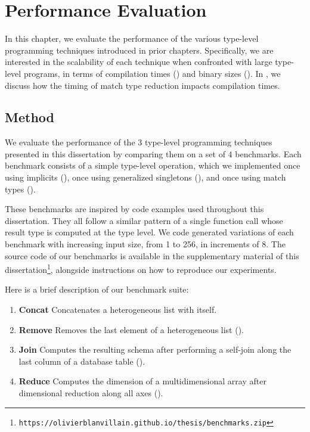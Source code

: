 

\chapter{Performance Evaluation}
\label{chap:performance-evaluation}

In this chapter, we evaluate the performance of the various type-level programming techniques introduced in prior chapters.
Specifically, we are interested in the scalability of each technique when confronted with large type-level programs, in terms of compilation times () and binary sizes ().
In , we discuss how the timing of match type reduction impacts compilation times.

\section{Method}

We evaluate the performance of the 3 type-level programming techniques presented in this dissertation by comparing them on a set of 4 benchmarks.
Each benchmark consists of a simple type-level operation, which we implemented once using implicits (), once using generalized singletons (), and once using match types ().

These benchmarks are inspired by code examples used throughout this dissertation. They all follow a similar pattern of a single function call whose result type is computed at the type level. We code generated variations of each benchmark with increasing input size, from 1 to 256, in increments of 8.
The source code of our benchmarks is available in the supplementary material of this dissertation\footnote{\texttt{https://olivierblanvillain.github.io/thesis/benchmarks.zip}}, alongside instructions on how to reproduce our experiments.

Here is a brief description of our benchmark suite:

\begin{enumerate}
  \item \textbf{Concat}\quad
  Concatenates a heterogeneous list with itself.

  \item \textbf{Remove}\quad
  Removes the last element of a heterogeneous list ().

  \item \textbf{Join}\quad
  Computes the resulting schema after performing a self-join along the last column of a database table ().

  \item \textbf{Reduce}\quad
  Computes the dimension of a multidimensional array after dimensional reduction along all axes ().
\end{enumerate}

